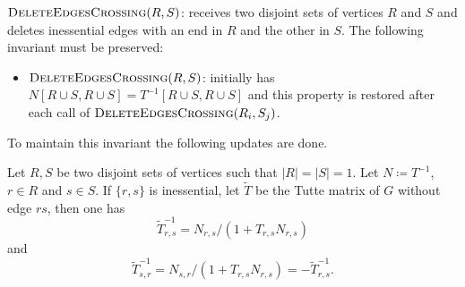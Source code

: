 $\textsc{DeleteEdgesCrossing}(R, S)$: receives two disjoint sets of vertices \(R\) and \(S\) and 
deletes inessential edges with an end in \(R\) and the other in \(S\).
The following invariant must be preserved:
\begin{itemize}
  \item \(\textsc{DeleteEdgesCrossing}(R, S)\): initially has \(N[R \cup S, R \cup S] = {T^{-1}}[R \cup S, R \cup S]\) and this property is restored after each call 
    of \(\textsc{DeleteEdgesCrossing}(R_i, S_j)\).
\end{itemize}
To maintain this invariant the following updates are done. 
\begin{theorem}
\label{update:1}
    Let \(R, S\) be two disjoint sets of vertices such that \(|R| = |S| = 1\).
    Let \(N \coloneqq T^{-1}\), \(r \in R\) and \(s \in S\).
    If \(\{r, s\}\) is inessential, let \(\tilde{T}\) be the Tutte matrix of \(G\) without edge \(rs\), then one has
    \[
        \tilde{T}^{-1}_{r, s} = N_{r, s} / (1 + T_{r, s} N_{r, s})
    \]
    and
    \[
        \tilde{T}^{-1}_{s, r} = N_{s, r} / (1 + T_{r, s} N_{r, s}) = -\tilde{T}^{-1}_{r, s}.
    \]
\end{theorem}

